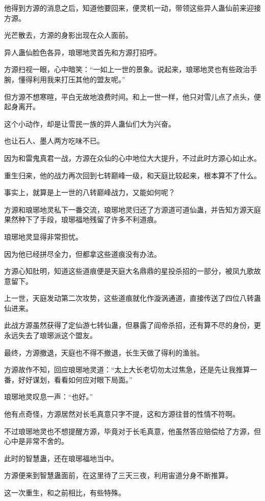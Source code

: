 \begin{this_body}
他得到方源的消息之后，知道他要回来，便灵机一动，带领这些异人蛊仙前来迎接方源。

光芒散去，方源的身影出现在众人面前。

异人蛊仙脸色各异，琅琊地灵首先和方源打招呼。

方源扫视一眼，心中暗笑：“一如上一世的景象。说起来，琅琊地灵也有些政治手腕，懂得利用我来打压其他的盟友呢。”

但方源不想寒暄，平白无故地浪费时间。和上一世一样，他只对雪儿点了点头，便起身离开。

这个小动作，却是让雪民一族的异人蛊仙们大为兴奋。

也让石人、墨人两方吃味不已。

因为和雷鬼真君一战，方源在众仙的心中地位大大提升，不过此时方源心如止水。

重生归来，他的战力再次回到七转巅峰一级，和天庭比较起来，根本算不了什么。

事实上，就算是上一世的八转巅峰战力，又能如何呢？

方源和琅琊地灵私下一番交流，琅琊地灵归还了方源道可道仙蛊，并告知方源天庭果然种下了手段，琅琊福地残留了许多不利道痕。

琅琊地灵显得非常担忧。

因为他已经拼尽全力，但都拿这些道痕没有办法。

方源心知肚明，知道这些道痕便是天庭大名鼎鼎的星投杀招的一部分，被凤九歌故意留下。

上一世，天庭发动第二次攻势，这些道痕就化作漩涡通道，直接传送了四位八转蛊仙进来。

此战方源虽然获得了定仙游七转仙蛊，但暴露了阎帝杀招，还有算不尽的身份，更永远失去了琅琊派这个盟友。

最终，方源撤退，天庭也不得不撤退，长生天做了得利的渔翁。

方源故作不知，回应琅琊地灵道：“太上大长老切勿太过焦急，还是先让我推算一番，好好谋划，看看如何应对眼下局面。”

琅琊地灵叹息一声：“也好。”

他有点奇怪，方源居然对长毛真意只字不提，这和方源往昔的性情不符啊。

不过琅琊地灵也不想提醒方源，毕竟对于长毛真意，他虽然答应赔偿给了方源，但心中是非常不舍的。

此时的智慧蛊，还在琅琊福地当中。

方源便来到智慧蛊面前，在这里待了三天三夜，利用宙道分身不断推算。

这一次重生，和之前相比，有些特殊。


\end{this_body}
